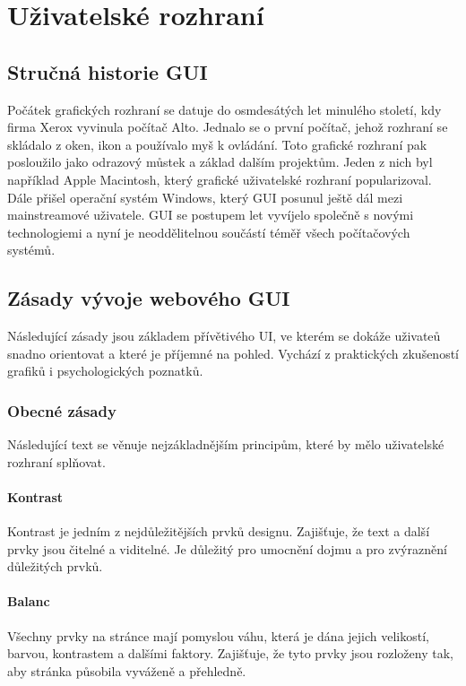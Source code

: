 \chapter{Uživatelské rozhraní}

\section{Stručná historie GUI}
Počátek grafických rozhraní se datuje do osmdesátých let minulého století, kdy firma Xerox vyvinula počítač Alto. Jednalo se o první počítač, jehož rozhraní se skládalo z oken, ikon a používalo myš k ovládání. Toto grafické rozhraní pak posloužilo jako odrazový můstek a základ dalším projektům. Jeden z nich byl například Apple Macintosh, který grafické uživatelské rozhraní popularizoval. Dále přišel operační systém Windows, který GUI posunul ještě dál mezi mainstreamové uživatele. GUI se postupem let vyvíjelo společně s novými technologiemi a nyní je neoddělitelnou součástí téměř všech počítačových systémů.

\section{Zásady vývoje webového GUI}
Následující zásady jsou základem přívětivého UI, ve kterém se dokáže uživateů snadno orientovat a které je příjemné na pohled. Vychází z praktických zkušeností grafiků i psychologických poznatků. 

\subsection{Obecné zásady}
Následující text se věnuje nejzákladnějším principům, které by mělo uživatelské rozhraní splňovat.\cite{principles_of_design}

\subsubsection*{Kontrast}
Kontrast je jedním z nejdůležitějších prvků designu. Zajišťuje, že text a další prvky jsou čitelné a viditelné. Je důležitý pro umocnění dojmu a pro zvýraznění důležitých prvků.

\subsubsection*{Balanc}
Všechny prvky na stránce mají pomyslou váhu, která je dána jejich velikostí, barvou, kontrastem a dalšími faktory. Zajišťuje, že tyto prvky jsou rozloženy tak, aby stránka působila vyváženě a přehledně.

